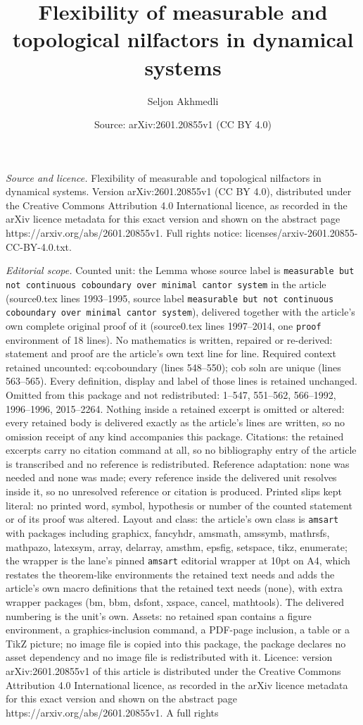 \documentclass[10pt,a4paper]{amsart}
\title[Flexibility of measurable and topological nilfactors in dyna]{Flexibility of measurable and topological nilfactors in dynamical systems}
\author{Seljon Akhmedli}
\date{Source: arXiv:2601.20855v1 (CC BY 4.0)}
\begin{document}
\maketitle

\noindent\emph{Source and licence.} Flexibility of measurable and topological nilfactors in dynamical systems. Version arXiv:2601.20855v1 (CC BY 4.0), distributed under the Creative Commons Attribution 4.0 International licence, as recorded in the arXiv licence metadata for this exact version and shown on the abstract page https://arxiv.org/abs/2601.20855v1. Full rights notice: licenses/arxiv-2601.20855-CC-BY-4.0.txt.\par\smallskip

\noindent\textit{Editorial scope.} Counted unit: the Lemma whose source label is \texttt{measurable but not continuous coboundary over minimal cantor system} in the article (source0.tex lines 1993--1995, source label \texttt{measurable but not continuous coboundary over minimal cantor system}), delivered together with the article's own complete original proof of it (source0.tex lines 1997--2014, one \texttt{proof} environment of 18 lines). No mathematics is written, repaired or re-derived: statement and proof are the article's own text line for line. Required context retained uncounted: eq:coboundary (lines 548--550); cob soln are unique (lines 563--565). Every definition, display and label of those lines is retained unchanged. Omitted from this package and not redistributed: 1--547, 551--562, 566--1992, 1996--1996, 2015--2264. Nothing inside a retained excerpt is omitted or altered: every retained body is delivered exactly as the article's lines are written, so no omission receipt of any kind accompanies this package. Citations: the retained excerpts carry no citation command at all, so no bibliography entry of the article is transcribed and no reference is redistributed. Reference adaptation: none was needed and none was made; every reference inside the delivered unit resolves inside it, so no unresolved reference or citation is produced. Printed slips kept literal: no printed word, symbol, hypothesis or number of the counted statement or of its proof was altered. Layout and class: the article's own class is \texttt{amsart} with packages including graphicx, fancyhdr, amsmath, amssymb, mathrsfs, mathpazo, latexsym, array, delarray, amsthm, epsfig, setspace, tikz, enumerate; the wrapper is the lane's pinned \texttt{amsart} editorial wrapper at 10pt on A4, which restates the theorem-like environments the retained text needs and adds the article's own macro definitions that the retained text needs (none), with extra wrapper packages (bm, bbm, dsfont, xspace, cancel, mathtools). The delivered numbering is the unit's own. Assets: no retained span contains a figure environment, a graphics-inclusion command, a PDF-page inclusion, a table or a TikZ picture; no image file is copied into this package, the package declares no asset dependency and no image file is redistributed with it. Licence: version arXiv:2601.20855v1 of this article is distributed under the Creative Commons Attribution 4.0 International licence, as recorded in the arXiv licence metadata for this exact version and shown on the abstract page https://arxiv.org/abs/2601.20855v1. A full rights 
\end{document}
